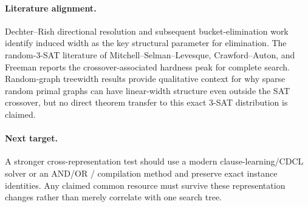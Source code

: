 \paragraph{Literature alignment.}
Dechter--Rish directional resolution and subsequent bucket-elimination work identify induced
width as the key structural parameter for elimination. The random-3-SAT literature of
Mitchell--Selman--Levesque, Crawford--Auton, and Freeman reports the crossover-associated
hardness peak for complete search. Random-graph treewidth results provide qualitative
context for why sparse random primal graphs can have linear-width structure even outside
the SAT crossover, but no direct theorem transfer to this exact 3-SAT distribution is
claimed.

\paragraph{Next target.}
A stronger cross-representation test should use a modern clause-learning/CDCL solver or an
AND/OR / compilation method and preserve exact instance identities. Any claimed common
resource must survive these representation changes rather than merely correlate with one
search tree.

